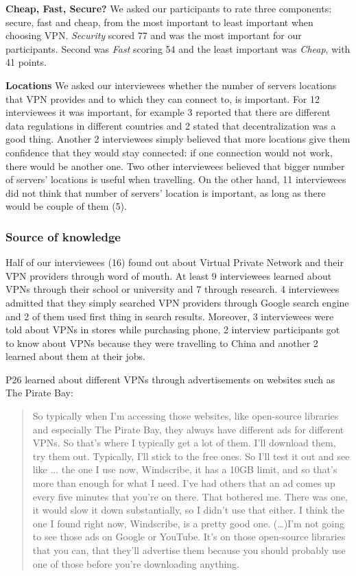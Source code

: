 \textbf{Cheap, Fast, Secure?} We asked our participants to rate three components: secure, fast and cheap, from the most important to least important when choosing VPN. \textit{Security} scored 77 and was the most important for our participants. Second was \textit{Fast} scoring 54 and the least important was \textit{Cheap}, with 41 points.


\textbf{Locations} We asked our interviewees whether the number of servers locations that VPN provides and to which they can connect to, is important. For 12 interviewees it was important, for example 3 reported that there are different data regulations in different countries and 2 stated that decentralization was a good thing. Another 2 interviewees simply believed that more locations give them confidence that they would stay connected: if one connection would not work, there would be another one. Two other interviewees believed that bigger number of servers’ locations is useful when travelling.  On the other hand, 11 interviewees did not think that number of servers’ location is important, as long as there would be couple of them (5).  

\subsubsection{Source of knowledge}
Half of our interviewees (16) found out about Virtual Private Network and their VPN providers through word of mouth. At least 9 interviewees learned about VPNs through their school or university and 7 through research. 4 interviewees admitted that they simply searched VPN providers through Google search engine and 2 of them used first thing in search results. Moreover, 3 interviewees were told about VPNs in stores while purchasing phone, 2 interview participants got to know about VPNs because they were travelling to China and another 2 learned about them at their jobs.

P26 learned about different VPNs through advertisements on websites such as The Pirate Bay:
\begin{quote}So typically when I'm accessing those websites, like open-source libraries and especially The Pirate Bay, they always have different ads for different VPNs. So that's where I typically get a lot of them. I'll download them, try them out. Typically, I'll stick to the free ones. So I'll test it out and see like ... the one I use now, Windscribe, it has a 10GB limit, and so that's more than enough for what I need. I've had others that an ad comes up every five minutes that you're on there. That bothered me. There was one, it would slow it down substantially, so I didn't use that either. I think the one I found right now, Windscribe, is a pretty good one.
(\dots)I'm not going to see those ads on Google or YouTube. It's on those open-source libraries that you can, that they'll advertise them because you should probably use one of those before you're downloading anything.\end{quote}

